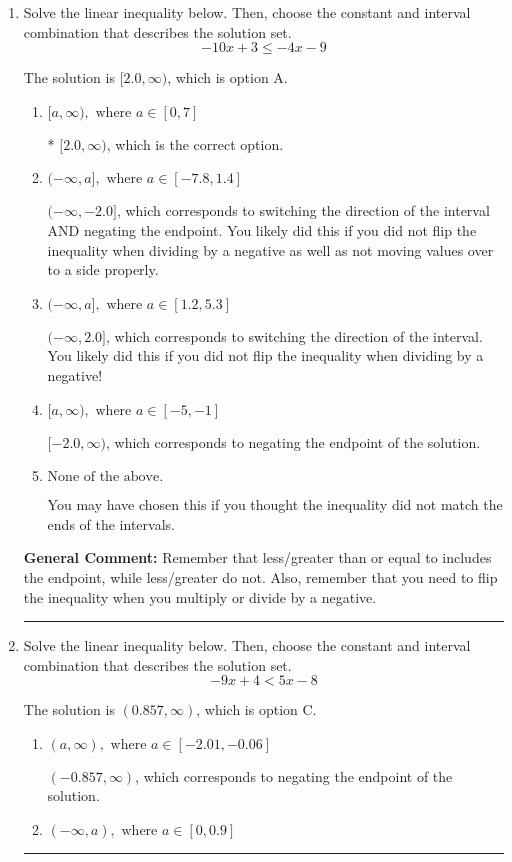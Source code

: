 \documentclass{extbook}[14pt]
\newcommand{\litem}[1]{\item #1

\rule{\textwidth}{0.4pt}}
\begin{document}
\begin{enumerate}\litem{
Solve the linear inequality below. Then, choose the constant and interval combination that describes the solution set.
\[ -10x + 3 \leq -4x -9 \]

The solution is \( [2.0, \infty) \), which is option A.\begin{enumerate}[label=\Alph*.]
\item \( [a, \infty), \text{ where } a \in [0, 7] \)

* $[2.0, \infty)$, which is the correct option.
\item \( (-\infty, a], \text{ where } a \in [-7.8, 1.4] \)

 $(-\infty, -2.0]$, which corresponds to switching the direction of the interval AND negating the endpoint. You likely did this if you did not flip the inequality when dividing by a negative as well as not moving values over to a side properly.
\item \( (-\infty, a], \text{ where } a \in [1.2, 5.3] \)

 $(-\infty, 2.0]$, which corresponds to switching the direction of the interval. You likely did this if you did not flip the inequality when dividing by a negative!
\item \( [a, \infty), \text{ where } a \in [-5, -1] \)

 $[-2.0, \infty)$, which corresponds to negating the endpoint of the solution.
\item \( \text{None of the above}. \)

You may have chosen this if you thought the inequality did not match the ends of the intervals.
\end{enumerate}

\textbf{General Comment:} Remember that less/greater than or equal to includes the endpoint, while less/greater do not. Also, remember that you need to flip the inequality when you multiply or divide by a negative.
}
\litem{
Solve the linear inequality below. Then, choose the constant and interval combination that describes the solution set.
\[ -9x + 4 < 5x -8 \]

The solution is \( (0.857, \infty) \), which is option C.\begin{enumerate}[label=\Alph*.]
\item \( (a, \infty), \text{ where } a \in [-2.01, -0.06] \)

 $(-0.857, \infty)$, which corresponds to negating the endpoint of the solution.
\item \( (-\infty, a), \text{ where } a \in [0, 0.9] \)


\end{enumerate}}
\end{enumerate}
\end{document}
